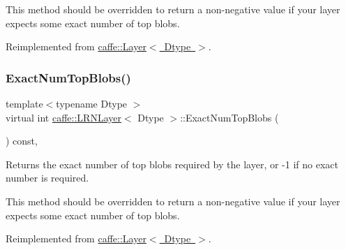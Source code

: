 This method should be overridden to return a non-\/negative value if your layer expects some exact number of top blobs. 

Reimplemented from \mbox{\hyperlink{classcaffe_1_1_layer_a64e2ca72c719e4b2f1f9216ccfb0d37f}{caffe\+::\+Layer$<$ Dtype $>$}}.

\mbox{\label{classcaffe_1_1_l_r_n_layer_ac0ee88b119c38749c50e914521cdc148}} 
\subsubsection{\texorpdfstring{Exact\+Num\+Top\+Blobs()}{ExactNumTopBlobs()}\hspace{0.1cm}{\footnotesize\ttfamily [2/2]}}
{\footnotesize\ttfamily template$<$typename Dtype $>$ \\
virtual int \mbox{\hyperlink{classcaffe_1_1_l_r_n_layer}{caffe\+::\+L\+R\+N\+Layer}}$<$ Dtype $>$\+::Exact\+Num\+Top\+Blobs (\begin{DoxyParamCaption}{ }\end{DoxyParamCaption}) const\hspace{0.3cm}{\ttfamily [inline]}, {\ttfamily [virtual]}}



Returns the exact number of top blobs required by the layer, or -\/1 if no exact number is required. 

This method should be overridden to return a non-\/negative value if your layer expects some exact number of top blobs. 

Reimplemented from \mbox{\hyperlink{classcaffe_1_1_layer_a64e2ca72c719e4b2f1f9216ccfb0d37f}{caffe\+::\+Layer$<$ Dtype $>$}}.

\mbox{\label{classcaffe_1_1_l_r_n_layer_a4fa3b333b55b43e28534905bec151e09}} 
